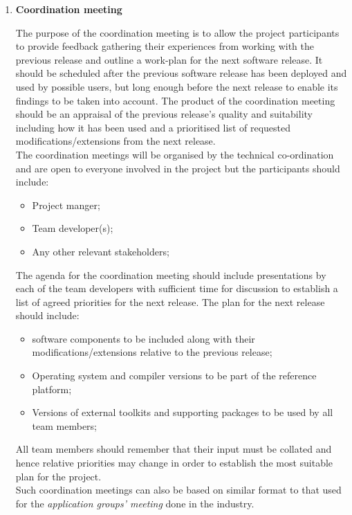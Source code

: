 \begin{enumerate}
\item \textbf{Coordination meeting}

\noindent The purpose of the coordination meeting is to allow the project participants to provide feedback gathering their experiences from working with the previous release and outline a work-plan for the next software release.  It should be scheduled after the previous software release has been deployed and used by possible users, but long enough before the next release to enable its findings to be taken into account. The product of the coordination meeting should be an appraisal of the previous release’s quality and suitability including how it has been used and a prioritised list of requested modifications/extensions from the next release.\\

\noindent The coordination meetings will be organised by the technical co-ordination and are open to everyone involved in the project but the participants should include:
\begin{itemize}
\item Project manger;
\item Team developer(s);
\item Any other relevant stakeholders;
\end{itemize}
The agenda for the coordination meeting should include presentations by each of the team developers with sufficient time for discussion to establish a list of agreed priorities for the next release. The plan for the next release should include:
\begin{itemize}
\item software components to be included along with their modifications/extensions relative to the previous release;
\item Operating system and compiler versions to be part of the reference platform;
\item Versions of external toolkits and supporting packages to be used by all team members;
\end{itemize}

\noindent All team members should remember that their input must be collated and hence relative priorities may change in order to establish the most suitable plan for the project.\\

\noindent Such coordination meetings can also be based on similar format to that used for the \textit{application groups’ meeting} done in the industry.\\


\end{enumerate}
